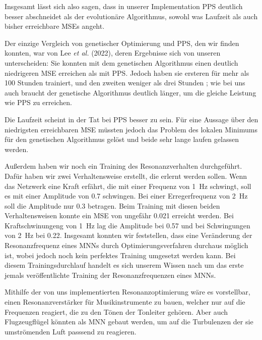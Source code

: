 \documentclass[10pt]{scrartcl}
\newcommand{\lee}{Lee {\itshape et al.} (2022)}
\begin{document}
Insgesamt lässt sich also sagen, dass in unserer Implementation PPS deutlich besser abschneidet als der evolutionäre Algorithmus, sowohl was Laufzeit als auch bisher erreichbare MSEs angeht.

Der einzige Vergleich von genetischer Optimierung und PPS, den wir finden konnten, war von \lee{}, deren Ergebnisse sich von unseren unterscheiden: Sie konnten mit dem genetischen Algorithmus einen deutlich niedrigeren MSE erreichen als mit PPS. Jedoch haben sie ersteren für mehr als 100 Stunden trainiert, und den zweiten weniger als drei Stunden \cite[Abb. 4]{Lee2022}; wie bei uns auch braucht der genetische Algorithmus deutlich länger, um die gleiche Leistung wie PPS zu erreichen.

Die Laufzeit scheint in der Tat bei PPS besser zu sein. Für eine Aussage über den niedrigsten erreichbaren MSE müssten jedoch das Problem des lokalen Minimums für den genetischen Algorithmus gelöst und beide sehr lange laufen gelassen werden. 

Außerdem haben wir noch ein Training des Resonanzverhalten durchgeführt. Dafür haben wir zwei Verhaltensweise erstellt, die erlernt werden sollen. Wenn das Netzwerk eine Kraft erfährt, die mit einer Frequenz von \SI{1}{\hertz} schwingt, soll es mit einer Amplitude von \num{0.7} schwingen. Bei einer Erregerfrequenz von \SI{2}{\hertz} soll die Amplitude nur \num{0.3} betragen. Beim Training mit diesen beiden Verhaltensweisen konnte ein MSE von ungefähr \num{0.021} erreicht werden. Bei Kraftschwinungeng von \SI{1}{\hertz} lag die Amplitude bei \num{0.57} und bei Schwingungen von \SI{2}{\hertz} bei \num{0.22}. Insgesamt konnten wir feststellen, dass eine Veränderung der Resonanzfrequenz eines MNNs durch Optimierungsverfahren durchaus möglich ist, wobei jedoch noch kein perfektes Training umgesetzt werden kann. Bei diesem Trainingsdurchlauf handelt es sich unserem Wissen nach um das erste jemals veröffentlichte Training der Resonanzfrequenzen eines MNNs.

Mithilfe der von uns implementierten Resonanzoptimierung wäre es vorstellbar, einen Resonanzverstärker für Musikinstrumente zu bauen, welcher nur auf die Frequenzen reagiert, die zu den Tönen der Tonleiter gehören.
Aber auch Flugzeugflügel könnten als MNN gebaut werden, um auf die Turbulenzen der sie umströmenden Luft passsend zu reagieren.
\end{document}
